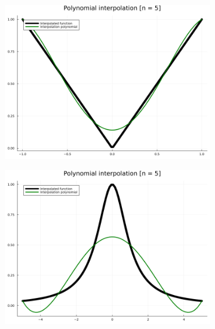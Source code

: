 \documentclass[11pt]{article}
\begin{document}
        \begin{figure}[htbp]
        \centering
            \begin{subfigure}[b]{0.45\textwidth}
                \includegraphics[width=\linewidth]{img/ex6_f1_n5.png}
            \end{subfigure}
            \hfill
            \begin{subfigure}[b]{0.45\textwidth}
                \includegraphics[width=\linewidth]{img/ex6_f2_n5.png}
            \end{subfigure}
        \end{figure}
        \newpage
\end{document}
